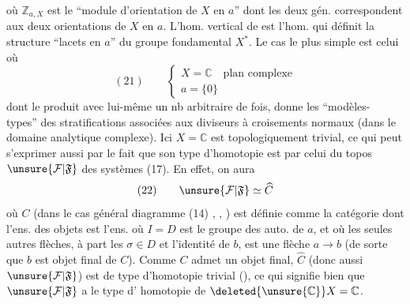 où $\mathbb Z_{a,X}$ est le ``module d'orientation de
$X$ en $a$'' dont les deux gén. correspondent
aux deux orientations de $X$ en $a$. L'hom.
vertical de  est l'hom. qui définit
la structure ``lacets en $a$'' du groupe
fondamental $X^*$. Le cas le plus
simple est celui où
\[
(21)\qquad\left\{\begin{array}{l}
X=\mathbb C\quad\text{plan complexe}\\
a=\{0\}
\end{array}\right.
\]
dont le produit avec lui-même un nb
arbitraire de fois, donne les ``modèles-
types'' des stratifications associées aux
diviseurs à croisements normaux (dans le
domaine analytique complexe). Ici
$X=\mathbb C$ est topologiquement trivial, ce qui
peut s'exprimer aussi par le fait que
son type d'homotopie est 
 par celui du topos $\unsure{\mathcal F|\mathfrak F}$ des
systèmes (17). En effet, on aura
\[
(22)\qquad \unsure{\mathcal F|\mathfrak F}\simeq\widehat C
\]
où $C$ (dans le cas général  diagramme
(14) ,
, 
) est définie comme la catégorie dont
l'ens. des objets est l'ens. 
où $I=D$ est le groupe des auto. de $a$, et où
les seules autres flèches, à part les $\sigma\in D$ et
l'identité de $b$, est une flèche $a\longrightarrow b$ (de
sorte que $b$ est objet final de $C$). Comme
$C$ admet un objet final, $\widehat C$  (donc aussi
$\unsure{\mathcal F|\mathfrak F}$) est de type d'homotopie trivial (),
ce qui signifie bien que $\unsure{\mathcal F|\mathfrak F}$ a le type d'
homotopie de $\deleted{\unsure{\mathbb C}}X=\mathbb C$.

